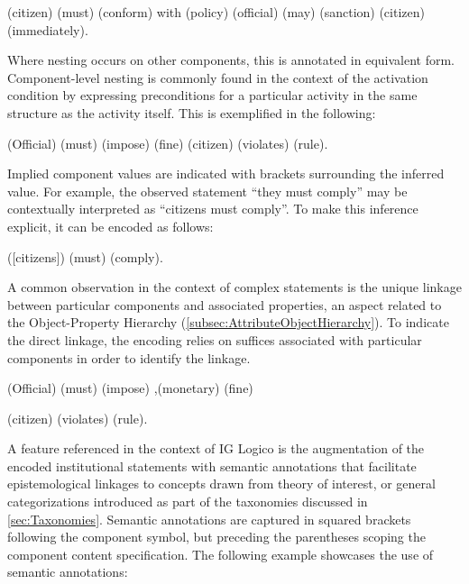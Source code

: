\vspace{0.2cm}
\begin{exa}
\A{}(citizen) \D{}(must) \I{}(conform) with \Bdir{}(policy) \Oe\lb \A{}(official) \D{}(may) \I{}(sanction) \Bdir{}(citizen)
\Cex{}(immediately)\rb.
\end{exa}
\vspace{0.2cm}

Where nesting occurs on other components, this is annotated in equivalent form. Component-level nesting is commonly found in the context of the activation condition by expressing preconditions for a particular activity in the same structure as the activity itself. This is exemplified in the following: 

\vspace{0.2cm}
\begin{exa}
\A{}(Official) \D{}(must) \I{}(impose) \Bdir{}(fine) \Cac{}\lb \A{}(citizen) \I{}(violates) \Bdir{}(rule)\rb.
\end{exa}
\vspace{0.2cm}

Implied component values are indicated with brackets surrounding the inferred value. For example, the observed statement ``they must comply'' may be contextually interpreted as ``citizens must comply''. To make this inference explicit, it can be encoded as follows:

\vspace{0.2cm}
\begin{exa}
\A{}([citizens]) \D{}(must) \I{}(comply).
\end{exa}
\vspace{0.2cm}

A common observation in the context of complex statements is the unique linkage between particular components and associated properties, an aspect related to the Object-Property Hierarchy (\cref{subsec:AttributeObjectHierarchy}). To indicate the direct linkage, the encoding relies on suffices associated with particular components in order to identify the linkage. 

\vspace{0.2cm}
\begin{exa}
\A{}(Official) \D{}(must) \I{}(impose) ,\prop{}{}(monetary) (fine) 

\Cac{}\lb \A{}(citizen) \I{}(violates) \Bdir{}(rule)\rb.
\end{exa}
\vspace{0.2cm}

A feature referenced in the context of IG Logico is the augmentation of the encoded institutional statements with semantic annotations that facilitate epistemological linkages to concepts drawn from theory of interest, or general categorizations introduced as part of the taxonomies discussed in \cref{sec:Taxonomies}. Semantic annotations are captured in squared brackets following the component symbol, but preceding the parentheses scoping the component content specification. The following example showcases the use of semantic annotations:

